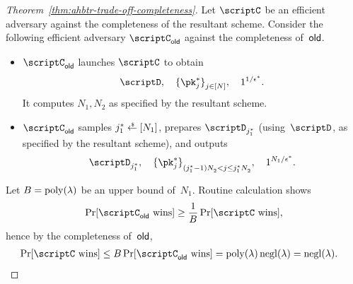\begin{proof}
[%
Theorem~\ref{thm:ahbtr-trade-off-completeness}]
Let $\scriptC$ be an efficient adversary against the completeness of the resultant scheme.
Consider the following efficient adversary $\scriptC_\OLD$ against the completeness of~$\OLD$.
\begin{itemize}
\item $\scriptC_\OLD$ launches $\scriptC$ to obtain
\begin{align*}
\scriptD,\quad
\{\pk^\ast_j\}_{j\in[N]}^\sphantom,\quad
1^{1/\epsilon^\ast}.
\end{align*}
It computes $N_1,N_2$ as specified by the resultant scheme.
\item $\scriptC_\OLD$ samples ${j^\ast_1\draws[N_1]}$,
prepares $\scriptD_{j^\ast_1}$ (using~$\scriptD$, as specified by the resultant scheme), and outputs
\begin{align*}
\scriptD_{j^\ast_1},\quad
\{\pk^\ast_j\}_{(j^\ast_1-1)N_2^\sphantom<j\leq j^\ast_1N_2^\sphantom}^\sphantom,\quad
1^{N_1/\epsilon^\ast}.
\end{align*}
\end{itemize}
Let ${B=\operatorname{poly}(\lambda)}$ be an upper bound of~$N_1$.
Routine calculation shows
\begin{align*}
\Pr[\scriptC_\OLD\textup{ wins}]
\geq
\frac{1}{B}\Pr[\scriptC\textup{ wins}],
\end{align*}
hence by the completeness of~$\OLD$,
\begin{align*}
\Pr[\scriptC\textup{ wins}]
&{}\leq
B\Pr[\scriptC_\OLD\textup{ wins}]
=
\poly(\lambda)\negl(\lambda)
=
\negl(\lambda).
\qedhere
\end{align*}
\end{proof}
